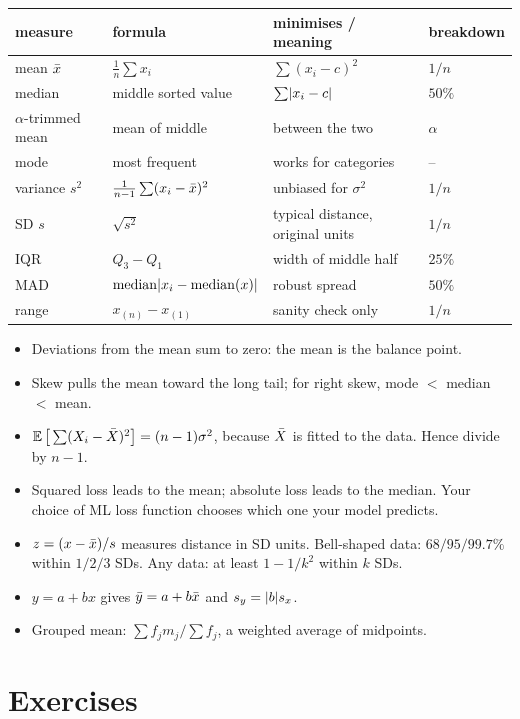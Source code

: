 \begin{center}
\renewcommand{\arraystretch}{1.25}
\begin{tabular}{l l l l}
\toprule
measure & formula & minimises / meaning & breakdown \\
\midrule
mean $\bar{x}$ & $\frac1n\sum x_i$ & $\sum (x_i-c)^2$ & $1/n$ \\
median & middle sorted value & $\sum \lvert x_i-c\rvert$ & $50\%$ \\
$\alpha$-trimmed mean & mean of middle & between the two & $\alpha$ \\
mode & most frequent & works for categories & -- \\
\midrule
variance $s^2$ & $\frac{1}{n-1}\sum (x_i-\bar{x})^2$ & unbiased for $\sigma^2$ & $1/n$ \\
SD $s$ & $\sqrt{s^2}$ & typical distance, original units & $1/n$ \\
IQR & $Q_3 - Q_1$ & width of middle half & $25\%$ \\
MAD & $\operatorname{median}\lvert x_i - \operatorname{median}(x)\rvert$ & robust spread & $50\%$ \\
range & $x_{(n)} - x_{(1)}$ & sanity check only & $1/n$ \\
\bottomrule
\end{tabular}
\end{center}

\begin{itemize}
  \item Deviations from the mean sum to zero: the mean is the balance point.
  \item Skew pulls the mean toward the long tail; for right skew,
  mode $<$ median $<$ mean.
  \item $\operatorname{\mathbb{E}}\big[\sum(X_i-\bar{X})^2\big] = (n-1)\sigma^2$, because $\bar{X}$ is fitted to
  the data. Hence divide by $n-1$.
  \item Squared loss leads to the mean; absolute loss leads to the median. Your choice
  of ML loss function chooses which one your model predicts.
  \item $z = (x-\bar{x})/s$ measures distance in SD units. Bell-shaped data:
  $68/95/99.7\%$ within $1/2/3$ SDs. Any data: at least $1-1/k^2$ within $k$ SDs.
  \item $y = a + bx$ gives $\bar{y} = a + b\bar{x}$ and $s_y = \lvert b\rvert s_x$.
  \item Grouped mean: $\sum f_j m_j / \sum f_j$, a weighted average of midpoints.
\end{itemize}

\section{Exercises}
\label{sec:center-spread-exercises}

